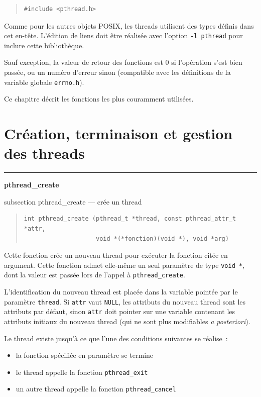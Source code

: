 \documentclass [twoside] {report}
\newcommand {\primitive} [1]
    {
	\phantomsection
	{\large \textbf {#1}}
	\addcontentsline {toc} {subsection} {#1}
    }
\newcommand {\separation}
    {
	\vspace {5mm}
	\nopagebreak
	\hrule
    }
\begin{document}
\begin {quote}
\begin {verbatim}
#include <pthread.h>
\end{verbatim}
\end {quote}

Comme pour les autres objets POSIX, les threads utilisent des types
définis dans cet en-tête. L'édition de liens doit être réalisée avec
l'option \verb|-l pthread| pour inclure cette bibliothèque.

Sauf exception, la valeur de retour des fonctions est 0 si l'opération
s'est bien passée, ou un numéro d'erreur sinon (compatible avec les
définitions de la variable globale \texttt {errno.h}).

Ce chapitre décrit les fonctions les plus couramment utilisées.


\section {Création, terminaison et gestion des threads}

\separation 
\primitive {pthread\_create} --- crée un thread

\begin {quote}
\begin {verbatim}
int pthread_create (pthread_t *thread, const pthread_attr_t *attr,
                    void *(*fonction)(void *), void *arg)
\end{verbatim}
\end {quote}

Cette fonction crée un nouveau thread pour exécuter la fonction
citée en argument. Cette fonction admet elle-même un seul paramètre
de type \verb|void *|, dont la valeur est passée lors de l'appel à
\verb|pthread_create|.

L'identification du nouveau thread est placée dans la variable pointée
par le paramètre \texttt {thread}. Si \texttt {attr} vaut \texttt {NULL},
les attributs du nouveau thread sont les attributs par défaut, sinon
\texttt {attr} doit pointer sur une variable contenant les attributs
initiaux du nouveau thread (qui ne sont plus modifiables \textit {a
posteriori}).

Le thread existe jusqu'à ce que l'une des conditions suivantes se
réalise~:

\begin {itemize}
    \item la fonction spécifiée en paramètre se termine
    \item le thread appelle la fonction \texttt {pthread\_exit}
    \item un autre thread appelle la fonction \texttt {pthread\_cancel}
\end {itemize}
\end{document}
